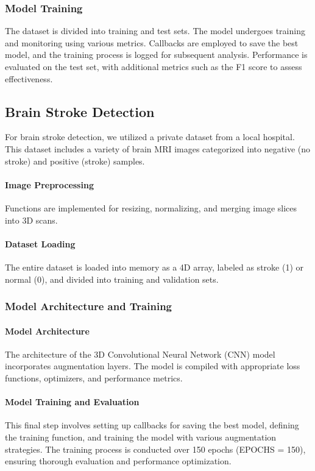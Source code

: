 \documentclass[conference]{IEEEtran}
\begin{document}
\subsubsection{Model Training}
The dataset is divided into training and test sets. The model undergoes training and monitoring using various metrics. 
Callbacks are employed to save the best model, and the training process is logged for subsequent analysis. 
Performance is evaluated on the test set, with additional metrics such as the F1 score to assess effectiveness.

\subsection{Brain Stroke Detection}

For brain stroke detection, we utilized a private dataset from a local hospital. 
This dataset includes a variety of brain MRI images categorized into negative (no stroke) and positive (stroke) samples.

\paragraph{Image Preprocessing}
Functions are implemented for resizing, normalizing, and merging image slices into 3D scans.

\paragraph{Dataset Loading}
The entire dataset is loaded into memory as a 4D array, labeled as stroke (1) or normal (0), and divided into training and validation sets.

\subsubsection{Model Architecture and Training}

\paragraph{Model Architecture}
The architecture of the 3D Convolutional Neural Network (CNN) model incorporates augmentation layers. 
The model is compiled with appropriate loss functions, optimizers, and performance metrics.

\paragraph{Model Training and Evaluation}
This final step involves setting up callbacks for saving the best model, defining the training function, and training the model with various augmentation strategies. 
The training process is conducted over 150 epochs (EPOCHS = 150), ensuring thorough evaluation and performance optimization.
\end{document}

